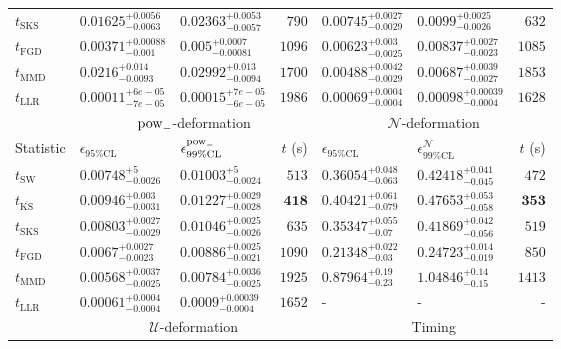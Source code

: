 \begin{tabular}{l|llr|llr}
	$t_{\mathrm{SKS}}$ & $0.01625_{-0.0063}^{+0.0056}$ & $0.02363_{-0.0057}^{+0.0053}$ & $790$ & $0.00745_{-0.0029}^{+0.0027}$ & $0.0099_{-0.0026}^{+0.0025}$ & $632$ \\
	$t_{\mathrm{FGD}}$ & ${\mathbf{0.00371_{-0.001}^{+0.00088}}}$ & ${\mathbf{0.005_{-0.00081}^{+0.0007}}}$ & $1096$ & $0.00623_{-0.0025}^{+0.003}$ & $0.00837_{-0.0023}^{+0.0027}$ & $1085$ \\
	$t_{\mathrm{MMD}}$ & $0.0216_{-0.0093}^{+0.014}$ & $0.02992_{-0.0094}^{+0.013}$ & $1700$ & ${\mathbf{0.00488_{-0.0029}^{+0.0042}}}$ & ${\mathbf{0.00687_{-0.0027}^{+0.0039}}}$ & $1853$ \\
	$t_{\mathrm{LLR}}$ & $0.00011_{-7e-05}^{+6e-05}$ & $0.00015_{-6e-05}^{+7e-05}$ & $1986$ & $0.00069_{-0.0004}^{+0.0004}$ & $0.00098_{-0.0004}^{+0.00039}$ & $1628$ \\
	\toprule
	\multicolumn{1}{c}{} & \multicolumn{3}{c}{$\rm{pow}_{-}$-deformation} & \multicolumn{3}{c}{$\mathcal{N}$-deformation} \\
	Statistic & $\epsilon_{95\%\mathrm{CL}}$ & $\epsilon^  {\rm{pow}_{-}}_{99\%\mathrm{CL}}$ & $t$ (s) & $\epsilon_{95\%\mathrm{CL}}$ & $\epsilon^    {\mathcal{N}}_{99\%\mathrm{CL}}$ & $t$ (s) \\
	\midrule
	$t_{\mathrm{SW}}$ & $0.00748_{-0.0026}^{+5}$ & $0.01003_{-0.0024}^{+5}$ & $513$ & $0.36054_{-0.063}^{+0.048}$ & $0.42418_{-0.045}^{+0.041}$ & $472$ \\
	$t_{\overline{\mathrm{KS}}}$ & $0.00946_{-0.0031}^{+0.003}$ & $0.01227_{-0.0028}^{+0.0029}$ & ${\mathbf{418}}$ & $0.40421_{-0.079}^{+0.061}$ & $0.47653_{-0.058}^{+0.053}$ & ${\mathbf{353}}$ \\
	$t_{\mathrm{SKS}}$ & $0.00803_{-0.0029}^{+0.0027}$ & $0.01046_{-0.0026}^{+0.0025}$ & $635$ & $0.35347_{-0.07}^{+0.055}$ & $0.41869_{-0.056}^{+0.042}$ & $519$ \\
	$t_{\mathrm{FGD}}$ & $0.0067_{-0.0023}^{+0.0027}$ & $0.00886_{-0.0021}^{+0.0025}$ & $1090$ & ${\mathbf{0.21348_{-0.03}^{+0.022}}}$ & ${\mathbf{0.24723_{-0.019}^{+0.014}}}$ & $850$ \\
	$t_{\mathrm{MMD}}$ & ${\mathbf{0.00568_{-0.0025}^{+0.0037}}}$ & ${\mathbf{0.00784_{-0.0025}^{+0.0036}}}$ & $1925$ & $0.87964_{-0.23}^{+0.19}$ & $1.04846_{-0.15}^{+0.14}$ & $1413$ \\
	$t_{\mathrm{LLR}}$ & $0.00061_{-0.0004}^{+0.0004}$ & $0.0009_{-0.0004}^{+0.00039}$ & $1652$ & - & - & - \\
	\toprule
	\multicolumn{1}{c}{} & \multicolumn{3}{c}{$\mathcal{U}$-deformation} & \multicolumn{3}{c}{Timing} \\

\end{tabular}
